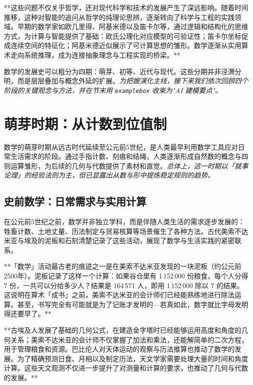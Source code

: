 **这些问题不仅关乎哲学，还对现代科学和技术的发展产生了深远影响。随着时间推移，这种对智能的追问从哲学的纯理论思辨，逐渐转向了科学与工程的实践领域。早期的数学家如欧几里得、阿基米德以及笛卡尔等，通过逻辑和结构化的思维方式，为计算与智能提供了基础：欧氏公理化对应模型的可验证性；笛卡尔坐标促成连续空间的特征化；阿基米德近似展示了可计算思想的雏形。数学逐渐从实用算术走向系统推理，成为连接抽象理念与工程实现的桥梁。**

数学的发展史可以粗分为四期：萌芽、初等、近代与现代。这些分期并非泾渭分明，而是层层叠加与概念外延的扩展。\emph{为把握演化主线，接下来我们依次回顾四个阶段的关键观念与方法，并在节末用 \texttt{examplebox} 收束为"AI 建模要点"。}

\section{萌芽时期：从计数到位值制}

数学的萌芽时期从远古时代延续至公元前5世纪，是人类最早利用数学工具应对日常生活需求的阶段。通过手指计数、刻痕和结绳，人类逐渐形成自然数的概念与四则运算雏形，为后续的几何与代数提供了素材和直觉。\emph{总体上，这一时期以「就事论理」的经验法则为主，但已显露出从数与形中提炼稳定规则的趋势。}

\subsection{史前数学：日常需求与实用计算}

在公元前5世纪之前，数学并非独立学科，而是伴随人类生活的需求逐步发展的：牲畜计数、土地丈量、历法制定与贸易核算等场景催生了各种方法。古代美索不达米亚与埃及的泥板和石刻清楚记录了这些活动，展现了数学与生活实践的紧密联系。

**「数学」活动最古老的痕迹之一是在美索不达米亚发现的一块泥板（约公元前2500年）。泥板记录了这样一个计算：如果谷仓里有 1\,152\,000 份粮食，每个人分得 7 份，一共可以分给多少人？结果是 164\,571 人，即用 1\,152\,000 除以 7 的结果。这说明在算术「成书」之前，美索不达米亚的会计师们已经能熟练地进行除法运算。甚至，书写完全有可能就是为了记账才发明的---若真如此，数字就比字母发明得还要早了。**

**古埃及人发展了基础的几何公式，在建造金字塔时已经能够运用高度和角度的几何关系；美索不达米亚的会计师不仅掌握了加法和乘法，还能解简单的二次方程，用于管理粮食和资源。巴比伦人对天体运动的观察与历法推算也推动了数学的发展。为了精确预测日食、月相以及制定历法，天文学家需要处理大量的时间和角度计算。这些天文观测不仅进一步提升了对测量和计算的要求，也推动了几何与代数的发展。**

